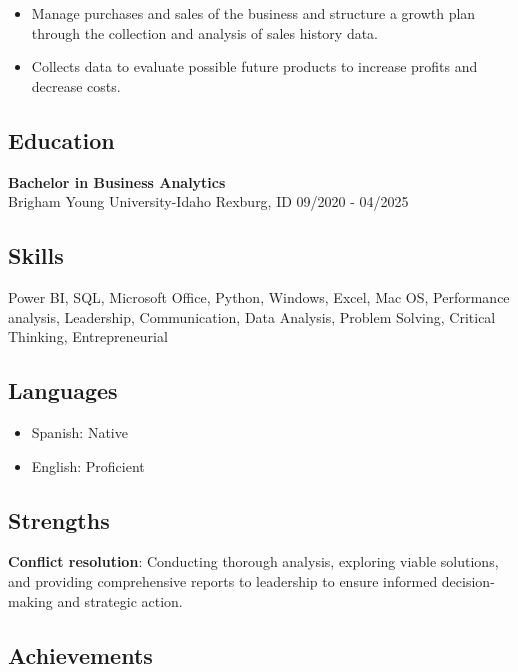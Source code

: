 \documentclass[
  letterpaper,
  DIV=11,
  numbers=noendperiod]{scrartcl}
\providecommand{\tightlist}{%
  \setlength{\itemsep}{0pt}\setlength{\parskip}{0pt}}\usepackage{longtable,booktabs,array}
\begin{document}
\begin{itemize}
\tightlist
\item
  Manage purchases and sales of the business and structure a growth plan
  through the collection and analysis of sales history data.
\item
  Collects data to evaluate possible future products to increase profits
  and decrease costs.
\end{itemize}

\subsection{Education}\label{education}

\textbf{Bachelor in Business Analytics}\\
Brigham Young University-Idaho \textbar{} Rexburg, ID \textbar{} 09/2020
- 04/2025

\subsection{Skills}\label{skills}

Power BI, SQL, Microsoft Office, Python, Windows, Excel, Mac OS,
Performance analysis, Leadership, Communication, Data Analysis, Problem
Solving, Critical Thinking, Entrepreneurial

\subsection{Languages}\label{languages}

\begin{itemize}
\tightlist
\item
  Spanish: Native
\item
  English: Proficient
\end{itemize}

\subsection{Strengths}\label{strengths}

\textbf{Conflict resolution}: Conducting thorough analysis, exploring
viable solutions, and providing comprehensive reports to leadership to
ensure informed decision-making and strategic action.

\subsection{Achievements}\label{achievements}
\end{document}
